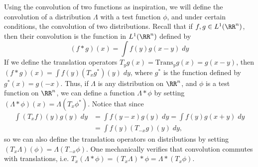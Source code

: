 Using the convolution of two functions as inspiration, we will define the convolution of a distribution $\Lambda$ with a test function $\phi$, and under certain conditions, the convolution of two distributions. Recall that if $f,g \in L^1(\RR^n)$, then their convolution is the function in $L^1(\RR^n)$ defined by
%
\[ (f * g)(x) = \int f(y) g(x - y)\; dy \]
%
If we define the translation operators $T_y g(x) = \text{Trans}_y g(x) = g(x - y)$, then $(f * g)(x) = \int f(y) (T_x g^*)(y)\; dy$, where $g^*$ is the function defined by $g^*(x) = g(-x)$. Thus, if $\Lambda$ is any distribution on $\RR^n$, and $\phi$ is a test function on $\RR^n$, we can define a function $\Lambda * \phi$ by setting $(\Lambda * \phi)(x) = \Lambda(T_x \phi^*)$. Notice that since
%
\begin{align*}
    \int (T_x f)(y) g(y)\; dy &= \int f(y-x) g(y)\; dy = \int f(y) g(x+y)\; dy\\
    &= \int f(y) (T_{-x}g)(y)\; dy,
\end{align*}
%
so we can also define the translation operators on distributions by setting $(T_x \Lambda)(\phi) = \Lambda (T_{-x} \phi)$. One mechanically verifies that convolution commutes with translations, i.e. $T_x (\Lambda * \phi) = (T_x \Lambda) * \phi = \Lambda * (T_x \phi)$.

